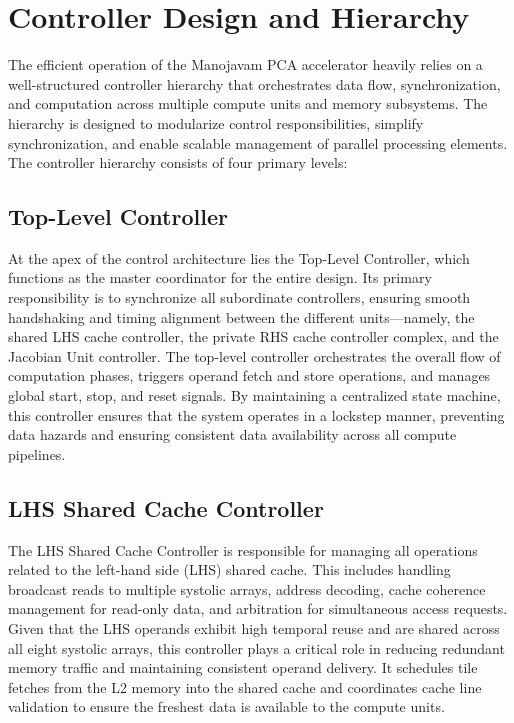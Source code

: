 \section{Controller Design and Hierarchy}
The efficient operation of the Manojavam PCA accelerator heavily relies on a well-structured controller hierarchy that orchestrates data flow, synchronization, and computation across multiple compute units and memory subsystems. The hierarchy is designed to modularize control responsibilities, simplify synchronization, and enable scalable management of parallel processing elements. The controller hierarchy consists of four primary levels:

\subsection{Top-Level Controller}
At the apex of the control architecture lies the Top-Level Controller, which functions as the master coordinator for the entire design. Its primary responsibility is to synchronize all subordinate controllers, ensuring smooth handshaking and timing alignment between the different units—namely, the shared LHS cache controller, the private RHS cache controller complex, and the Jacobian Unit controller. The top-level controller orchestrates the overall flow of computation phases, triggers operand fetch and store operations, and manages global start, stop, and reset signals. By maintaining a centralized state machine, this controller ensures that the system operates in a lockstep manner, preventing data hazards and ensuring consistent data availability across all compute pipelines.

\subsection{LHS Shared Cache Controller}
The LHS Shared Cache Controller is responsible for managing all operations related to the left-hand side (LHS) shared cache. This includes handling broadcast reads to multiple systolic arrays, address decoding, cache coherence management for read-only data, and arbitration for simultaneous access requests. Given that the LHS operands exhibit high temporal reuse and are shared across all eight systolic arrays, this controller plays a critical role in reducing redundant memory traffic and maintaining consistent operand delivery. It schedules tile fetches from the L2 memory into the shared cache and coordinates cache line validation to ensure the freshest data is available to the compute units.

